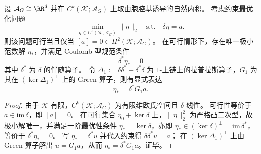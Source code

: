 \begin{theorem}\label{thm:pom-pw-minnorm-counterterm-hodge}
设 \(\mathcal{A}_G\cong\RR^d\) 并在 \(C^k(\mathcal K;\mathcal{A}_G)\) 上取由胞腔基诱导的自然内积。
考虑约束最优化问题
\[
\min_{\eta\in C^1(\mathcal K;\mathcal{A}_G)} \|\eta\|_2
\quad\text{s.t.}\quad \delta\eta=a.
\]
则该问题可行当且仅当 \([a]=0\in H^2(\mathcal K;\mathcal{A}_G)\)。
在可行情形下，存在唯一极小范数解 \(\eta_\ast\)，并满足 Coulomb 型规范条件
\[
\boxed{\;\delta^\ast \eta_\ast=0\;}
\]
其中 \(\delta^\ast\) 为 \(\delta\) 的伴随算子。
令 \(\Delta_1:=\delta\delta^\ast+\delta^\ast\delta\) 为 \(1\)-上链上的拉普拉斯算子，\(G_1\) 为其在 \((\ker\Delta_1)^\perp\) 上的 Green 算子，则有显式表达
\[
\boxed{\;\eta_\ast=\delta^\ast G_1 a.\;}
\]
\end{theorem}
\begin{proof}
由于 \(\mathcal K\) 有限，\(C^k(\mathcal K;\mathcal{A}_G)\) 为有限维欧氏空间且 \(\delta\) 线性。
可行性等价于 \(a\in\mathrm{im}\,\delta\)，即 \([a]=0\)。
在可行集合 \(\eta_0+\ker\delta\) 上，\(\|\eta\|_2^2\) 为严格凸二次型，故极小解唯一，并满足一阶最优性条件
\(
\eta_\ast\perp\ker\delta
\)，亦即 \(\eta_\ast\in(\ker\delta)^\perp=\mathrm{im}\,\delta^\ast\)，等价于 \(\delta^\ast\eta_\ast=0\)。
写 \(\eta_\ast=\delta^\ast u\) 并代入约束得 \(\delta\delta^\ast u=a\)；
在 \((\ker\Delta_1)^\perp\) 上由 Green 算子解出 \(u=G_1 a\)，从而 \(\eta_\ast=\delta^\ast G_1 a\)。证毕。
\end{proof}
